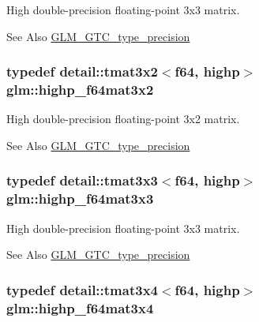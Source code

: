 High double-\/precision floating-\/point 3x3 matrix. \begin{DoxySeeAlso}{See Also}
\hyperlink{group__gtc__type__precision}{G\-L\-M\-\_\-\-G\-T\-C\-\_\-type\-\_\-precision} 
\end{DoxySeeAlso}
\hypertarget{group__gtc__type__precision_ga5cdc9d6fb9ce07e5485c4e2db919ce7e}{
\subsubsection[{highp\-\_\-f64mat3x2}]{\setlength{\rightskip}{0pt plus 5cm}typedef detail\-::tmat3x2$<$f64, highp$>$ {\bf glm\-::highp\-\_\-f64mat3x2}}}\label{group__gtc__type__precision_ga5cdc9d6fb9ce07e5485c4e2db919ce7e}
High double-\/precision floating-\/point 3x2 matrix. \begin{DoxySeeAlso}{See Also}
\hyperlink{group__gtc__type__precision}{G\-L\-M\-\_\-\-G\-T\-C\-\_\-type\-\_\-precision} 
\end{DoxySeeAlso}
\hypertarget{group__gtc__type__precision_gaf520a9307867c632408029a53af3e375}{
\subsubsection[{highp\-\_\-f64mat3x3}]{\setlength{\rightskip}{0pt plus 5cm}typedef detail\-::tmat3x3$<$f64, highp$>$ {\bf glm\-::highp\-\_\-f64mat3x3}}}\label{group__gtc__type__precision_gaf520a9307867c632408029a53af3e375}
High double-\/precision floating-\/point 3x3 matrix. \begin{DoxySeeAlso}{See Also}
\hyperlink{group__gtc__type__precision}{G\-L\-M\-\_\-\-G\-T\-C\-\_\-type\-\_\-precision} 
\end{DoxySeeAlso}
\hypertarget{group__gtc__type__precision_ga4144f547189dd7e52b4dd282f41a1cd1}{
\subsubsection[{highp\-\_\-f64mat3x4}]{\setlength{\rightskip}{0pt plus 5cm}typedef detail\-::tmat3x4$<$f64, highp$>$ {\bf glm\-::highp\-\_\-f64mat3x4}}}\label{group__gtc__type__precision_ga4144f547189dd7e52b4dd282f41a1cd1}
